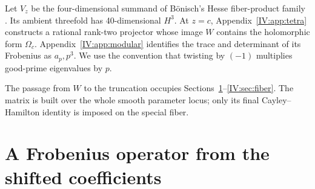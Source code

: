 \documentclass[11pt,letterpaper]{article}
\theoremstyle{definition}
\theoremstyle{remark}
\begin{document}
Let $V_z$ be the four-dimensional summand of B\"onisch's Hesse
fiber-product family \cite[\S5.1]{IV:bonisch}. Its ambient threefold has
40-dimensional $H^3$. At $z=c$, Appendix~\ref{IV:app:tetra} constructs
a rational rank-two projector whose image $W$ contains the
holomorphic form $\Omega_c$. Appendix~\ref{IV:app:modular} identifies
the trace and determinant of its Frobenius as $a_p,p^3$.
We use the convention that twisting by $(-1)$ multiplies good-prime
eigenvalues by $p$.

The passage from $W$ to the truncation occupies
Sections~\ref{IV:sec:shift}--\ref{IV:sec:fiber}. The matrix is built
over the whole smooth parameter locus; only its final
Cayley--Hamilton identity is imposed on the special fiber.
\section{A Frobenius operator from the shifted coefficients}\label{IV:sec:shift}
\end{document}
